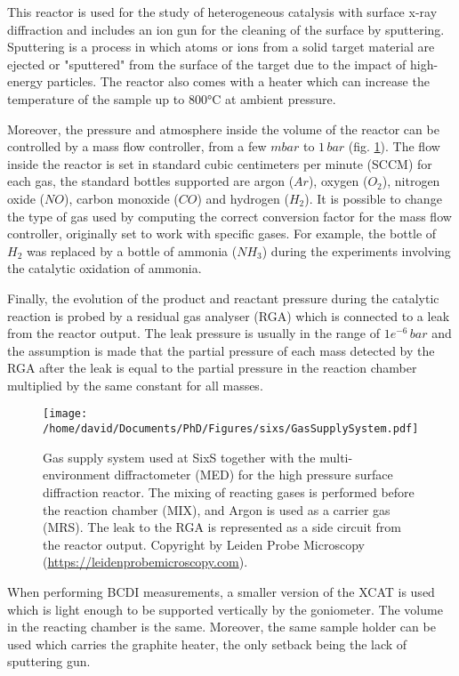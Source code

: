 This reactor is used for the study of heterogeneous catalysis with surface x-ray diffraction and includes an ion gun for the cleaning of the surface by sputtering.
Sputtering is a process in which atoms or ions from a solid target material are ejected or "sputtered" from the surface of the target due to the impact of high-energy particles.
The reactor also comes with a heater which can increase the temperature of the sample up to 800°C at ambient pressure.

Moreover, the pressure and atmosphere inside the volume of the reactor can be controlled by a mass flow controller, from a few $m\si{bar}$ to $1 \, \si{bar}$ (fig. \ref{fig:GasSupplySystem}).
The flow inside the reactor is set in standard cubic centimeters per minute (SCCM) for each gas, the standard bottles supported are argon ($Ar$), oxygen ($O_2$), nitrogen oxide ($NO$), carbon monoxide ($CO$) and hydrogen ($H_2$).
It is possible to change the type of gas used by computing the correct conversion factor for the mass flow controller, originally set to work with specific gases.
For example, the bottle of $H_2$ was replaced by a bottle of ammonia ($NH_3$) during the experiments involving the catalytic oxidation of ammonia.

Finally, the evolution of the product and reactant pressure during the catalytic reaction is probed by a residual gas analyser (RGA) which is connected to a leak from the reactor output.
The leak pressure is usually in the range of $1e^{-6} \, \si{bar}$ and the assumption is made that the partial pressure of each mass detected by the RGA after the leak is equal to the partial pressure in the reaction chamber multiplied by the same constant for all masses.

\begin{figure}[!htb]
    \centering
    \texttt{[image: /home/david/Documents/PhD/Figures/sixs/GasSupplySystem.pdf]}
    \caption{
    	Gas supply system used at SixS together with the multi-environment diffractometer (MED) for the high pressure surface diffraction reactor.
    	The mixing of reacting gases is performed before the reaction chamber (MIX), and Argon is used as a carrier gas (MRS).
    	The leak to the RGA is represented as a side circuit from the reactor output.
    	Copyright by Leiden Probe Microscopy (\url{https://leidenprobemicroscopy.com}).
    }
    \label{fig:GasSupplySystem}
\end{figure}

When performing BCDI measurements, a smaller version of the XCAT is used which is light enough to be supported vertically by the goniometer.
The volume in the reacting chamber is the same.
Moreover, the same sample holder can be used which carries the graphite heater, the only setback being the lack of sputtering gun.

